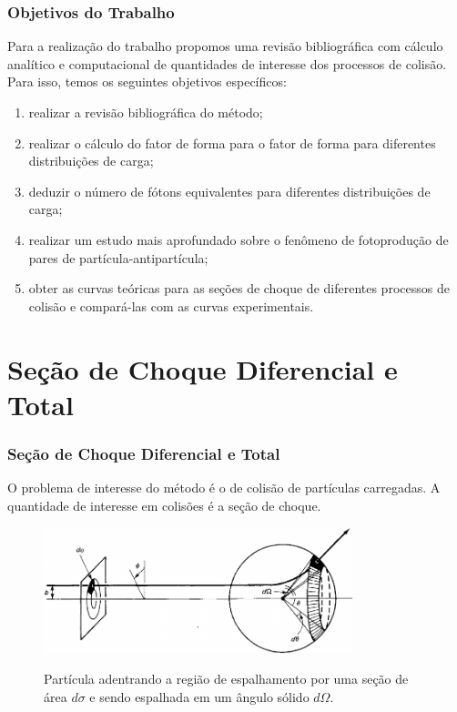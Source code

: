 \documentclass[xcolor=dvipsnames]{beamer}
\begin{document}
\begin{frame}
	\frametitle{Objetivos do Trabalho}

	Para a realização do trabalho propomos uma revisão bibliográfica com cálculo
	analítico e computacional de quantidades de interesse dos processos de
	colisão. Para isso, temos os seguintes objetivos específicos:

	\begin{enumerate}
		\item realizar a revisão bibliográfica do método;
		\item realizar o cálculo do fator de forma para o fator de forma
			para diferentes distribuições de carga;
		\item deduzir o número de fótons equivalentes para diferentes
			distribuições de carga;
		\item realizar um estudo mais aprofundado sobre o fenômeno de
			fotoprodução de pares de partícula-antipartícula;
		\item obter as curvas teóricas para as seções de choque de diferentes
			processos de colisão e compará-las com as curvas experimentais.
	\end{enumerate}

\end{frame}

\section{Seção de Choque Diferencial e Total}
\begin{frame}
	\frametitle{Seção de Choque Diferencial e Total}

	O problema de interesse do método é o de colisão de partículas carregadas.
	A quantidade de interesse em colisões é a seção de choque.

	\begin{figure}[h]
		\centering
		\includegraphics[width=0.8\textwidth]{./figs/cross_section.jpeg}
		\label{fig_cross_section}
		\caption{Partícula adentrando a região de espalhamento por uma
		seção de área $d\sigma$ e  sendo espalhada em um ângulo sólido
		$d\Omega$.}
	\end{figure}
\end{frame}
\end{document}
